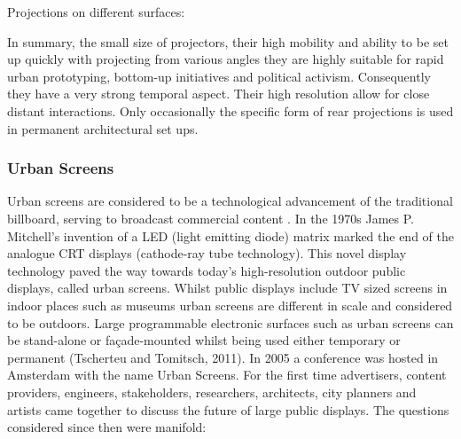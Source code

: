 Projections on different surfaces: 

In summary, the small size of projectors, their high mobility and ability to be set up quickly with projecting from various angles they are highly suitable for rapid urban prototyping, bottom-up initiatives and political activism.  Consequently they have a very strong temporal aspect.
Their high resolution allow for close distant interactions.
Only occasionally the specific form of rear projections is used in permanent architectural set ups.


\subsubsection{Urban Screens}

Urban screens are considered to be a technological advancement of the traditional billboard, serving to broadcast commercial content \cite{Huhtamo2009}. 
In the 1970s James P. Mitchell's invention of a LED (light emitting diode) matrix marked the end of the analogue CRT displays (cathode-ray tube technology). This novel display technology paved the way towards today's high-resolution outdoor public displays, called urban screens.
Whilst public displays include TV sized screens in indoor places such as museums urban screens are different in scale and considered to be outdoors. 
Large programmable electronic surfaces such as urban screens can be stand-alone or façade-mounted whilst being used either temporary or permanent (Tscherteu and Tomitsch, 2011). 
In 2005 a conference was hosted in Amsterdam with the name Urban Screens. For the first time advertisers, content providers, engineers, stakeholders, researchers, architects, city planners and artists came together to discuss the future of large public displays. 
The questions considered since then were manifold:


